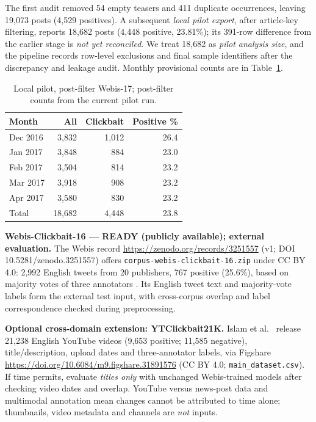 \documentclass[11pt]{article}
\begin{document}
The first audit removed 54 empty teasers and 411 duplicate occurrences, leaving 19,073 posts (4,529 positives). A subsequent \emph{local pilot export}, after article-key filtering, reports 18,682 posts (4,448 positive, 23.81\%); its 391-row difference from the earlier stage is \emph{not yet reconciled}. We treat 18,682 as \emph{pilot analysis size}, and the pipeline records row-level exclusions and final sample identifiers after the discrepancy and leakage audit. Monthly provisional counts are in Table~\ref{tab:months}.

\begin{table}[t]
\centering\small\setlength{\tabcolsep}{5pt}
\caption{Local pilot, post-filter Webis-17; post-filter counts from the current pilot run.}
\label{tab:months}
\begin{tabular}{@{}lrrr@{}}\toprule
Month & All & Clickbait & Positive \%\\\midrule
Dec 2016 & 3,832 & 1,012 & 26.4\\
Jan 2017 & 3,848 & 884 & 23.0\\
Feb 2017 & 3,504 & 814 & 23.2\\
Mar 2017 & 3,918 & 908 & 23.2\\
Apr 2017 & 3,580 & 830 & 23.2\\\midrule
Total & 18,682 & 4,448 & 23.8\\\bottomrule
\end{tabular}
\end{table}

\textbf{Webis-Clickbait-16 --- READY (publicly available); external evaluation.} The Webis record \url{https://zenodo.org/records/3251557} (v1; DOI 10.5281/zenodo.3251557) offers \texttt{corpus-webis-clickbait-16.zip} under CC BY 4.0: 2,992 English tweets from 20 publishers, 767 positive (25.6\%), based on majority votes of three annotators \cite{potthast2016}. Its English tweet text and majority-vote labels form the external test input, with cross-corpus overlap and label correspondence checked during preprocessing.

\textbf{Optional cross-domain extension: YTClickbait21K.} Islam et al.\ \cite{islam2026} release 21,238 English YouTube videos (9,653 positive; 11,585 negative), title/description, upload dates and three-annotator labels, via Figshare \url{https://doi.org/10.6084/m9.figshare.31891576} (CC BY 4.0; \texttt{main\_dataset.csv}). If time permits, evaluate \emph{titles only} with unchanged Webis-trained models after checking video dates and overlap. YouTube versus news-post data and multimodal annotation mean changes cannot be attributed to time alone; thumbnails, video metadata and channels are \emph{not} inputs.
\end{document}
